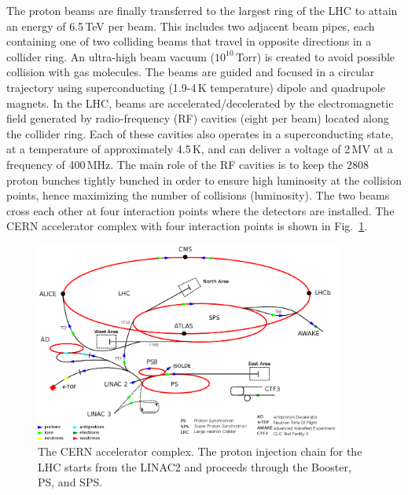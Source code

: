 The proton beams are finally transferred to the largest ring of the LHC to attain an energy of 6.5\,TeV per beam. This includes two adjacent beam pipes, each containing one of two colliding beams that travel in opposite directions in a collider ring. An ultra-high beam vacuum ($10^{10}$\,Torr) is created to avoid possible collision with gas molecules. The beams are guided and focused in a circular trajectory using superconducting (1.9-4\,K temperature) dipole and quadrupole magnets. In the LHC, beams are accelerated/decelerated by the electromagnetic field generated by radio-frequency (RF) cavities (eight per beam) located along the collider ring. Each of these cavities also operates in a superconducting state, at a temperature of approximately 4.5\,K, and can deliver a voltage of 2\,MV at a frequency of 400\,MHz. The main role of the RF cavities is to keep the 2808 proton bunches tightly bunched in order to ensure high luminosity at the collision points, hence maximizing the number of collisions (luminosity). The two beams cross each other at four interaction points where the detectors are installed. The CERN accelerator complex with four interaction points is shown in Fig.~\ref{fig:LHC_complex}.

\begin{figure}[h]
\centering
\includegraphics[width=0.9\textwidth]{fig/lhc/LHC_complex.png}
\caption{\label{fig:LHC_complex} The CERN accelerator complex. The proton injection chain for the LHC starts from the LINAC2 and proceeds through the Booster, PS, and SPS.}
\end{figure}

